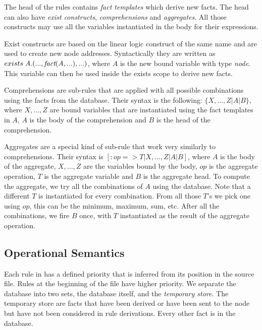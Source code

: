 The head of the rules contains \emph{fact templates} which derive new facts. The head can also have \emph{exist constructs}, \emph{comprehensions} and \emph{aggregates}. All those constructs may use all the variables instantiated in the body for their expressions.

Exist constructs are based on the linear logic construct of the same name and are used to create new node addresses. Syntactically they are written as $exists \; A. (..., \emph{fact}(A, ...), ...)$, where $A$ is the new bound variable with type \emph{node}. This variable can then be used inside the exists scope to derive new facts.

Comprehensions are sub-rules that are applied with all possible combinations using the facts from the database. Their syntax is the following: $\{X, ..., Z | A | B\}$, where $X, ..., Z$ are bound variables that are instantiated using the fact templates in $A$, $A$ is the body of the comprehension and $B$ is the head of the comprehension.

Aggregates are a special kind of sub-rule that work very similarly to comprehensions. Their syntax is $[:op => T | X, ..., Z | A | B]$, where $A$ is the body of the aggregate, $X, ..., Z$ are the variables bound by the body, $op$ is the aggregate operation, $T$ is the aggregate variable and $B$ is the aggregate head. To compute the aggregate, we try all the combinations of $A$ using the database. Note that a different $T$ is instantiated for every combination. From all those $T$'s we pick one using $op$, this can be the minimum, maximum, sum, etc. After all the combinations, we fire $B$ once, with $T$ instantiated as the result of the aggregate operation.

\subsection{Operational Semantics}

Each rule in \lang has a defined priority that is inferred from its position in the source file. Rules at the beginning of the file have higher priority. We separate the database into two sets,
the database itself, and the \emph{temporary store}. The temporary store are facts that have been
derived or have been sent to the node but have not been considered in rule derivations. Every other fact is in the database.

